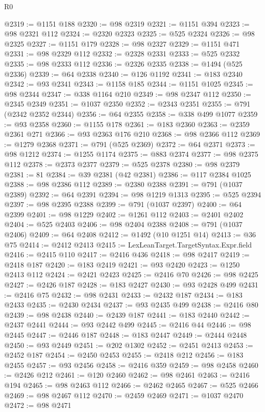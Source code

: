 \begin{lexlean}{R0}
\begin{coremodule}
@2319 := @1151 @188
@2320 := @98 @2319
@2321 := @1151 @394
@2323 := @98 @2321 @112
@2324 := @2320 @2323
@2325 := @525 @2324
@2326 := @98 @2325
@2327 := @1151 @179
@2328 := @98 @2327
@2329 := @1151 @471
@2331 := @98 @2329 @112
@2332 := @2328 @2331
@2333 := @525 @2332
@2335 := @98 @2333 @112
@2336 := @2326 @2335
@2338 := @1494 (@525 @2336)
@2339 := @64 @2338
@2340 := @126 @1192
@2341 := @183 @2340
@2342 := @93 @2341
@2343 := @1158 @185
@2344 := @1151 @1025
@2345 := @98 @2344
@2347 := @338 @1164 @210
@2349 := @98 @2347 @112
@2350 := @2345 @2349
@2351 := @1037 @2350
@2352 := @2343 @2351
@2355 := @791 (@2342 @2352 @2344)
@2356 := @64 @2355
@2358 := @338 @499 @1077
@2359 := @93 @2358
@2360 := @1155 @178
@2361 := @183 @2360
@2363 := @2359 @2361 @271
@2366 := @93 @2363 @176 @210
@2368 := @98 @2366 @112
@2369 := @1279 @2368
@2371 := @791 (@525 @2369)
@2372 := @64 @2371
@2373 := @98 @1212
@2374 := @1255 @1174
@2375 := @883 @2374
@2377 := @98 @2375 @112
@2378 := @2373 @2377
@2379 := @525 @2378
@2380 := @98 @2379
@2381 := 81
@2384 := @39 @2381 (@42 @2381)
@2386 := @117 @2384 @1025
@2388 := @98 @2386 @112
@2389 := @2380 @2388
@2391 := @791 (@1037 @2389)
@2392 := @64 @2391
@2394 := @98 @1219 @1313
@2395 := @525 @2394
@2397 := @98 @2395 @2388
@2399 := @791 (@1037 @2397)
@2400 := @64 @2399
@2401 := @98 @1229
@2402 := @1261 @112
@2403 := @2401 @2402
@2404 := @525 @2403
@2406 := @98 @2404 @2388
@2408 := @791 (@1037 @2406)
@2409 := @64 @2408
@2412 := @1492 (@10 @1251 @14)
@2413 := @36 @75
@2414 := @2412 @2413
@2415 := LexLeanTarget.TargetSyntax.Expr.field
@2416 := @2415 @110
@2417 := @2416 @436
@2418 := @98 @2417
@2419 := @2418 @187
@2420 := @183 @2419
@2421 := @93 @2420
@2423 := @1250 @2413 @112
@2424 := @2421 @2423
@2425 := @2416 @70
@2426 := @98 @2425
@2427 := @2426 @187
@2428 := @183 @2427
@2430 := @93 @2428 @499
@2431 := @2416 @75
@2432 := @98 @2431
@2433 := @2432 @187
@2434 := @183 @2433
@2435 := @2430 @2434
@2437 := @93 @2435 @499
@2438 := @2416 @80
@2439 := @98 @2438
@2440 := @2439 @187
@2441 := @183 @2440
@2442 := @2437 @2441
@2444 := @93 @2442 @499
@2445 := @2416 @44
@2446 := @98 @2445
@2447 := @2446 @187
@2448 := @183 @2447
@2449 := @2444 @2448
@2450 := @93 @2449
@2451 := @202 @1302
@2452 := @2451 @2413
@2453 := @2452 @187
@2454 := @2450 @2453
@2455 := @2418 @212
@2456 := @183 @2455
@2457 := @93 @2456
@2458 := @2416 @359
@2459 := @98 @2458
@2460 := @2426 @212
@2461 := @120 @2460
@2462 := @98 @2461
@2463 := @2416 @194
@2465 := @98 @2463 @112
@2466 := @2462 @2465
@2467 := @525 @2466
@2469 := @98 @2467 @112
@2470 := @2459 @2469
@2471 := @1037 @2470
@2472 := @98 @2471

\end{coremodule}
\end{lexlean}

